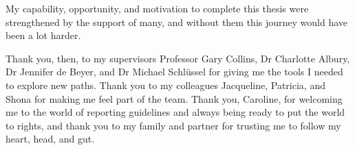 My capability, opportunity, and motivation to complete this thesis were strengthened by the support of many, and without them this journey would have been a lot harder.

Thank you, then, to my supervisors Professor Gary Collins, Dr Charlotte Albury, Dr Jennifer de Beyer, and Dr Michael Schlüssel for giving me the tools I needed to explore new paths. Thank you to my colleagues Jacqueline, Patricia, and Shona for making me feel part of the team. Thank you, Caroline, for welcoming me to the world of reporting guidelines and always being ready to put the world to rights, and thank you to my family and partner for trusting me to follow my heart, head, and gut.